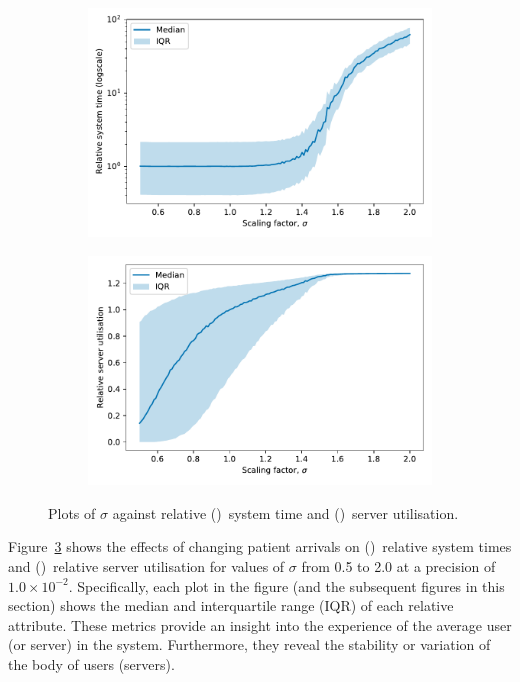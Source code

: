 \begin{figure}
    \centering
    \begin{subfigure}{.5\imgwidth}
        \includegraphics[width=\linewidth]{lambda_time}
        \caption{}\label{fig:lambda_time}
    \end{subfigure}\hfill%
    \begin{subfigure}{.5\imgwidth}
        \includegraphics[width=\linewidth]{lambda_util}
        \caption{}\label{fig:lambda_util}
    \end{subfigure}
    \caption{%
        Plots of \(\sigma\) against relative ()~system
        time and ()~server utilisation.
    }\label{fig:lambda}
\end{figure}

Figure~\ref{fig:lambda} shows the effects of changing patient arrivals on
()~relative system times and
()~relative server utilisation for values of \(\sigma\)
from 0.5 to 2.0 at a precision of \(1.0 \times 10^{-2}\). Specifically, each
plot in the figure (and the subsequent figures in this section) shows the median
and interquartile range (IQR) of each relative attribute. These metrics provide
an insight into the experience of the average user (or server) in the system.
Furthermore, they reveal the stability or variation of the body of users
(servers).

